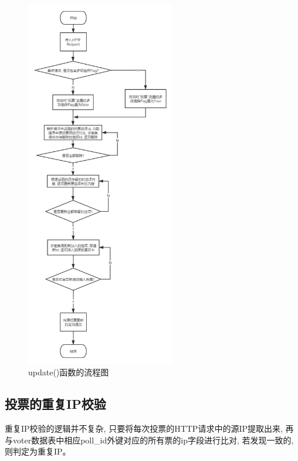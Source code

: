 \begin{figure}[hbp]
    \centering
    \includegraphics[width=0.58\textwidth]{support-files/4.5.1-pollcontroller-update-flowchart.png}
    \caption{update()函数的流程图}
    \label{fig:updateflowchart}
\end{figure}

\newpage

\subsection{投票的重复IP校验}

重复IP校验的逻辑并不复杂, 只要将每次投票的HTTP请求中的源IP提取出来, 再与voter数据表中相应poll\_id外键对应的所有票的ip字段进行比对, 若发现一致的, 则判定为重复IP。

